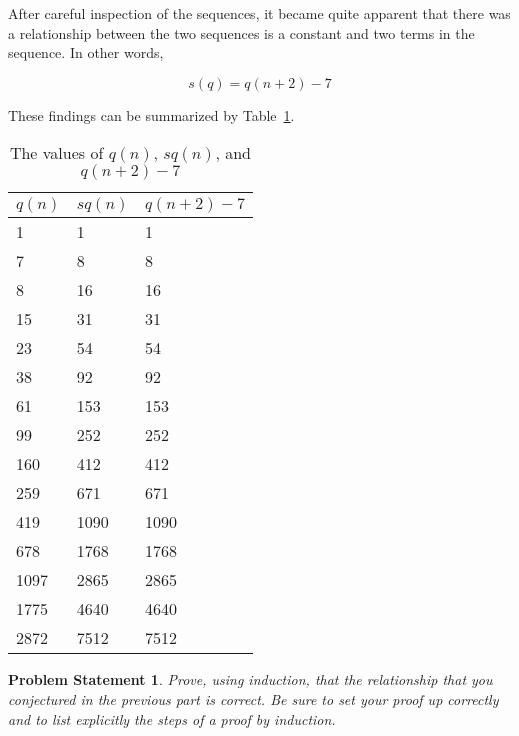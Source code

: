 \documentclass[12pt,listof=totoc,toc=sectionentrywithdots]{scrartcl}
\newtheorem*{statement}{Problem Statement}
\begin{document}
After careful inspection of the sequences, it became quite apparent that there was a relationship between the two sequences is a constant and two terms in the sequence. In other words,

\begin{equation}\label{eq:linear_relationship}
    s(q) = q(n + 2) - 7
\end{equation}

These findings can be summarized by Table~\ref{tab:sq_and_q}.

\begin{table}[H]
    \centering
    \caption{The values of $q(n)$, $sq(n)$, and $q(n + 2) - 7$}
    \label{tab:sq_and_q}
    \begin{tabular}{p{2cm}|p{2cm}|p{2cm}}
        \toprule
        $q(n)$ & $sq(n)$ & $q(n + 2) - 7$ \\\hline
        1    & 1    & 1 \\
        7    & 8    & 8 \\
        8    & 16   & 16 \\
        15   & 31   & 31 \\
        23   & 54   & 54 \\
        38   & 92   & 92 \\
        61   & 153  & 153 \\
        99   & 252  & 252 \\
        160  & 412  & 412 \\
        259  & 671  & 671 \\
        419  & 1090 & 1090 \\
        678  & 1768 & 1768 \\
        1097 & 2865 & 2865 \\
        1775 & 4640 & 4640 \\
        2872 & 7512 & 7512 \\\bottomrule
    \end{tabular}
\end{table}

\subproblem{}
\begin{statement}
    Prove, using induction, that the relationship that you conjectured in the previous part is correct. Be sure to set your proof up correctly and to list explicitly the steps of a proof by induction.
\end{statement}
\end{document}
